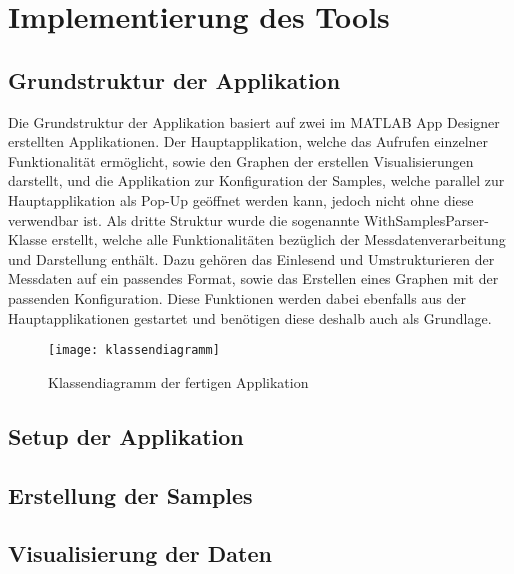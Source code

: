 
\chapter{Implementierung des Tools}

\section{Grundstruktur der Applikation}

Die Grundstruktur der Applikation basiert auf zwei im MATLAB App Designer erstellten Applikationen. Der Hauptapplikation, welche das Aufrufen einzelner Funktionalität ermöglicht, sowie den Graphen der erstellen Visualisierungen darstellt, und die Applikation zur Konfiguration der Samples, welche parallel zur Hauptapplikation als Pop-Up geöffnet werden kann, jedoch nicht ohne diese verwendbar ist. Als dritte Struktur wurde die sogenannte WithSamplesParser-Klasse erstellt, welche alle Funktionalitäten bezüglich der Messdatenverarbeitung und Darstellung enthält. Dazu gehören das Einlesend und Umstrukturieren der Messdaten auf ein passendes Format, sowie das Erstellen eines Graphen mit der passenden Konfiguration. Diese Funktionen werden dabei ebenfalls aus der Hauptapplikationen gestartet und benötigen diese deshalb auch als Grundlage.

\begin{figure}[!htbp]
	\centering
	\texttt{[image: klassendiagramm]}
	\caption{Klassendiagramm der fertigen Applikation}
	\label{fig:klassendiagramm}
\end{figure}


\section{Setup der Applikation}


\section{Erstellung der Samples}


\section{Visualisierung der Daten}

